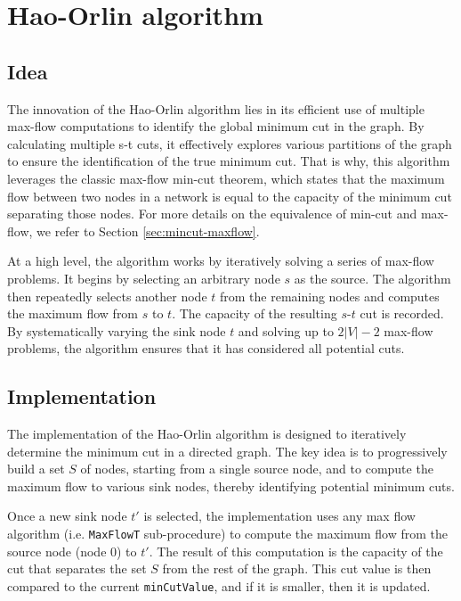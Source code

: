 \section{Hao-Orlin algorithm}
\label{sec:haoOrlin}

\subsection{Idea}
The innovation of the Hao-Orlin algorithm lies in its efficient use of multiple max-flow computations to identify the global minimum cut in the graph. By calculating multiple s-t cuts, it effectively explores various partitions of the graph to ensure the identification of the true minimum cut. That is why, this algorithm leverages the classic max-flow min-cut theorem, which states that the maximum flow between two nodes in a network is equal to the capacity of the minimum cut separating those nodes. For more details on the equivalence of min-cut and max-flow, we refer to Section \ref{sec:mincut-maxflow}.

At a high level, the algorithm works by iteratively solving a series of max-flow problems. It begins by selecting an arbitrary node \(s\) as the source. The algorithm then repeatedly selects another node \(t\) from the remaining nodes and computes the maximum flow from \(s\) to \(t\). The capacity of the resulting \(s\)-\(t\) cut is recorded. By systematically varying the sink node \(t\) and solving up to \(2|V| - 2\) max-flow problems, the algorithm ensures that it has considered all potential cuts.



\subsection{Implementation}
The implementation of the Hao-Orlin algorithm is designed to iteratively determine the minimum cut in a directed graph. The key idea is to progressively build a set \(S\) of nodes, starting from a single source node, and to compute the maximum flow to various sink nodes, thereby identifying potential minimum cuts.

Once a new sink node \(t'\) is selected, the implementation uses any max flow algorithm (i.e. \texttt{MaxFlowT} sub-procedure) to compute the maximum flow from the source node (node 0) to \(t'\). The result of this computation is the capacity of the cut that separates the set \(S\) from the rest of the graph. This cut value is then compared to the current \texttt{minCutValue}, and if it is smaller, then it is updated.

